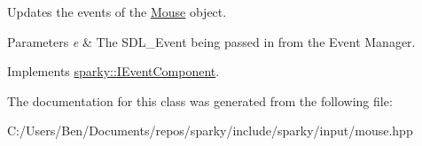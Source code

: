 Updates the events of the \hyperlink{classsparky_1_1_mouse}{Mouse} object. 


\begin{DoxyParams}{Parameters}
{\em e} & The S\+D\+L\+\_\+\+Event being passed in from the Event Manager. \\
\hline
\end{DoxyParams}


Implements \hyperlink{classsparky_1_1_i_event_component_a061c2e74b185caa2b02bc514c5a1544f}{sparky\+::\+I\+Event\+Component}.



The documentation for this class was generated from the following file\+:\begin{DoxyCompactItemize}
\item 
C\+:/\+Users/\+Ben/\+Documents/repos/sparky/include/sparky/input/mouse.\+hpp\end{DoxyCompactItemize}
